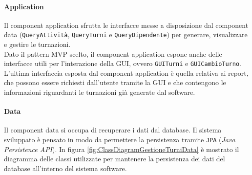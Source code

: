 \paragraph{Application}
Il component application sfrutta le interfacce messe a disposizione dal component data (\verb|QueryAttività|, \verb|QueryTurni| e \verb|QueryDipendente|) per generare, visualizzare e gestire le turnazioni.\\

\noindent
Dato il pattern MVP scelto, il component application espone anche delle interfacce utili per l'interazione della GUI, ovvero \verb|GUITurni| e \verb|GUICambioTurno|.\\

\noindent
L'ultima interfaccia esposta dal component application è quella relativa ai report, che possono essere richiesti dall'utente tramite la GUI e che contengono le informazioni riguardanti le turnazioni già generate dal software.
\paragraph{Data}
Il component data si occupa di recuperare i dati dal database. Il sistema sviluppato è pensato in modo da permettere la persistenza tramite \verb|JPA| (\textit{Java Persistence API}). In figura \ref{fig:ClassDiagramGestioneTurniData} è mostrato il diagramma delle classi utilizzate per mantenere la persistenza dei dati del database all'interno del sistema software.
